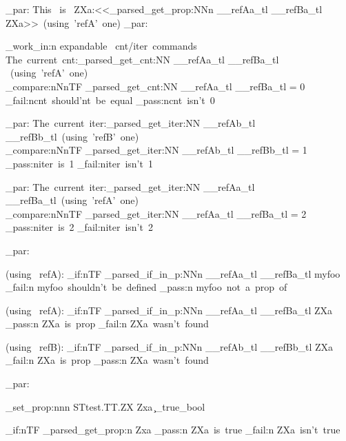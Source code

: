 \documentclass{article}
\begin{document}
\sttests_par:
This~ is~ ZXa:<<\starray_parsed_get_prop:NNn \__refAa_tl \__refBa_tl {ZXa}>>~(using~'refA'~one)
\sttests_par:

\sttests_work_in:n {expandable~ cnt/iter~commands}
The~current~cnt:\starray_parsed_get_cnt:NN \__refAa_tl \__refBa_tl ~(using~'refA'~one)\\

\int_compare:nNnTF {\starray_parsed_get_cnt:NN \__refAa_tl \__refBa_tl} = {0}
  {\sttests_fail:n{cnt~should'nt~be~equal}} 
  {\sttests_pass:n{cnt~isn't~0}}
  
\sttests_par:
The~current~iter:\starray_parsed_get_iter:NN \__refAb_tl \__refBb_tl~(using~'refB'~one)\\

\int_compare:nNnTF {\starray_parsed_get_iter:NN \__refAb_tl \__refBb_tl} = {1}
  {\sttests_pass:n{iter~is~1}} 
  {\sttests_fail:n{iter~isn't~1}}

\sttests_par:
The~current~iter:\starray_parsed_get_iter:NN \__refAa_tl \__refBa_tl~(using~'refA'~one)\\

\int_compare:nNnTF {\starray_parsed_get_iter:NN \__refAa_tl \__refBa_tl} = {2}
  {\sttests_pass:n{iter~is~2}} 
  {\sttests_fail:n{iter~isn't~2}}


\sttests_par:

(using~ refA):
\bool_if:nTF { \starray_parsed_if_in_p:NNn \__refAa_tl \__refBa_tl {myfoo} }
  {  \sttests_fail:n {myfoo~shouldn't~be~defined } }
  {   \sttests_pass:n {myfoo~not~a~prop~of } }

(using~ refA):
\bool_if:nTF { \starray_parsed_if_in_p:NNn \__refAa_tl \__refBa_tl {ZXa} }
  {  \sttests_pass:n {ZXa~is~prop } }
  {   \sttests_fail:n {ZXa~wasn't~found } }

(using~ refB):
\bool_if:nTF { \starray_parsed_if_in_p:NNn \__refAb_tl \__refBb_tl {ZXa} }
  {  \sttests_fail:n {ZXa~is~prop } }
  {   \sttests_pass:n {ZXa~wasn't~found } }




\sttests_par:


  
\starray_set_prop:nnn {STtest.TT.ZX}  {Zxa} {\c_true_bool}

\bool_if:nTF { \starray_parsed_get_prop:n {Zxa} }
  {  \sttests_pass:n {ZXa~is~true } }
  {   \sttests_fail:n {ZXa~isn't~true } }
\end{document}
